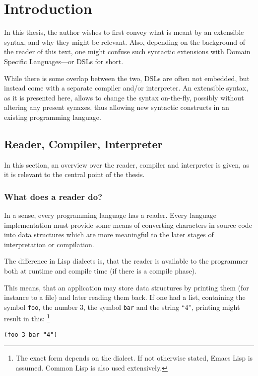 \documentclass[11pt]{article}
\newcommand{\el}{Emacs Lisp}
\newcommand{\cl}{Common Lisp}
\newcommand{\sym}[1]{\texttt{#1}}
\begin{document}
\section{Introduction}
\label{sec:intro}
In this thesis, the author wishes to first convey what is meant by an extensible
syntax, and why they might be relevant.  Also, depending on the background of
the reader of this text, one might confuse such syntactic extensions with Domain
Specific Languages—or DSLs for short.

While there is some overlap between the two, DSLs are often not embedded, but
instead come with a separate compiler and/or interpreter.  An extensible
syntax, as it is presented here, allows to change the syntax on-the-fly,
possibly without altering any present synaxes, thus allowing new syntactic
constructs in an existing programming language. 

\subsection{Reader, Compiler, Interpreter}
\label{subsec:reader-compiler-interpreter}

In this section, an overview over the reader, compiler and interpreter is given,
as it is relevant to the central point of the thesis.

\subsubsection{What does a reader do?}
\label{subsubsec:what-reader-does}

In a sense, every programming language has a reader.  Every language
implementation must provide some means of converting characters in source code
into data structures which are more meaningful to the later stages of
interpretation or compilation.

The difference in Lisp dialects is, that the reader is available to the
programmer both at runtime and compile time (if there is a compile phase).

This means, that an application may store data structures by printing them (for
instance to a file) and later reading them back.  If one had a list, containing
the symbol \sym{foo}, the number 3, the symbol \sym{bar} and the string ``4'',
printing might result in this: \footnote{The exact form depends on the dialect.
  If not otherwise stated, \el{} is assumed.  \cl{} is also used extensively.}

\begin{lstlisting}
(foo 3 bar "4")
\end{lstlisting}
\end{document}
